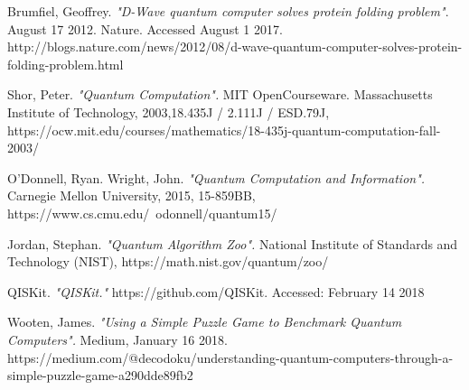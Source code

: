 \documentclass[a4paper]{article}
\begin{document}
\begin{thebibliography}{9}
	Brumfiel, Geoffrey. \emph{"D-Wave quantum computer solves protein folding problem"}. August 17 2012. Nature. Accessed August 1 2017. http://blogs.nature.com/news/2012/08/d-wave-quantum-computer-solves-protein-folding-problem.html
	

	Shor, Peter. \emph{"Quantum Computation".} MIT OpenCourseware. Massachusetts Institute of Technology, 2003,18.435J / 2.111J / ESD.79J, \newline https://ocw.mit.edu/courses/mathematics/18-435j-quantum-computation-fall-2003/

	O'Donnell, Ryan. Wright, John. \emph{"Quantum Computation and Information".} Carnegie Mellon University, 2015, 15-859BB, \newline https://www.cs.cmu.edu/~odonnell/quantum15/

	Jordan, Stephan. \emph{"Quantum Algorithm Zoo".} National Institute of Standards and Technology (NIST),  https://math.nist.gov/quantum/zoo/
	
	QISKit. \emph{"QISKit."} https://github.com/QISKit. Accessed: February 14 2018
 %

	Wooten, James. \emph{"Using a Simple Puzzle Game to Benchmark Quantum Computers".} Medium, January 16 2018. https://medium.com/@decodoku/understanding-quantum-computers-through-a-simple-puzzle-game-a290dde89fb2

%


\end{thebibliography}
\end{document}
